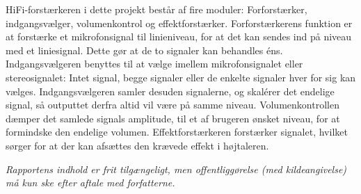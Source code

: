 \begin{multicols}{2}
{\begin{minipage}{2.8in}
HiFi-forstærkeren i dette projekt består af fire moduler: Forforstærker, indgangsvælger, volumenkontrol og effektforstærker. Forforstærkerens funktion er at forstærke et mikrofonsignal til linieniveau, for at det kan sendes ind på niveau med et liniesignal. Dette gør at de to signaler kan behandles éns.
Indgangsvælgeren benyttes til at vælge imellem mikrofonsignalet eller stereosignalet: Intet signal, begge signaler eller de enkelte signaler hver for sig kan vælges. Indgangsvælgeren samler desuden signalerne, og skalérer det endelige signal, så outputtet derfra altid vil være på samme niveau.
Volumenkontrollen dæmper det samlede signals amplitude, til et af brugeren ønsket niveau, for at formindske den endelige volumen.
Effektforstærkeren forstærker signalet, hvilket sørger for at der kan afsættes den krævede effekt i højtaleren.
\end{minipage}}
\newline
\end{multicols}

\textit{\scriptsize{Rapportens indhold er frit tilgængeligt, men offentliggørelse (med kildeangivelse) må kun ske efter aftale med forfatterne.}}
